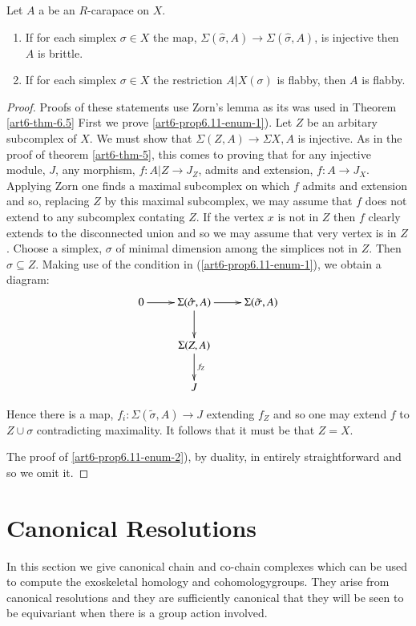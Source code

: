 \begin{prop}\label{art6-proposition-6.11}
Let $A$ a be an $R$-carapace on $X$.
    \begin{enumerate}[(1)]
    \item If for each simplex $\sigma \in X$ the map, $\Sigma(\hat{\sigma}, A)\rightarrow \Sigma(\hat{\sigma}, A)$, is injective then $A$ is brittle.\label{art6-prop6.11-enum-1}
    \item If for each simplex $\sigma \in X$ the restriction $A|{X}(\sigma)$ is flabby, then $A$
     is flabby.\label{art6-prop6.11-enum-2}
    \end{enumerate}
\end{prop}

\begin{proof}
Proofs of these statements use Zorn's lemma as its was used in Theorem \ref{art6-thm-6.5} First we prove
\ref{art6-prop6.11-enum-1}). Let $Z$ be an arbitary subcomplex of $X$. We must show that $\Sigma(Z, A)\rightarrow \Sigma{X, A}$ is injective. As in the proof of theorem \ref{art6-thm-5}, this comes to proving that for any injective module, $J$, any morphism, $f: A|Z \rightarrow J_{Z}$, admits and extension, $f:A\rightarrow J_{X}$. Applying Zorn one finds a maximal subcomplex on which $f$ admits and extension and so, replacing $Z$ by this maximal subcomplex, we may assume that $f$ does not extend to any subcomplex contating $Z$. If the vertex $x$ is not in $Z$ then $f$ clearly extends  to the disconnected union and so we may assume that very vertex is in $Z$. Choose a simplex, $\sigma$ of minimal dimension among the simplices not in $Z$.  Then $\hat{\sigma} \subseteq Z$. Making use of the condition in
(\ref{art6-prop6.11-enum-1}), we obtain a diagram:
$$
\xymatrix{
0 \ar[r] &\Sigma(\hat{\sigma}, A)\ar [d] \ar[r]& \Sigma(\tilde{\sigma}, A)\\
         & \Sigma(Z, A)\ar[d]^{f_{Z}} & \\
         & J                           &
}
$$

Hence there is a map, $f_{i} : \Sigma(\tilde{\sigma}, A) \rightarrow J$ extending $f_{Z}$ and so one may extend $f$ to $Z\cup \sigma$ contradicting maximality. It follows that it must be that $Z=X$.

The proof of \ref{art6-prop6.11-enum-2}), by duality, in entirely straightforward and so we omit it.
\end{proof}

\section{Canonical Resolutions}\label{art6-sec-7}
In this section we give canonical chain and co-chain complexes which can be used to compute the exoskeletal homology and cohomology\break groups. They arise from canonical resolutions and they are sufficiently canonical that they will be seen to be equivariant when there is a group action involved.


